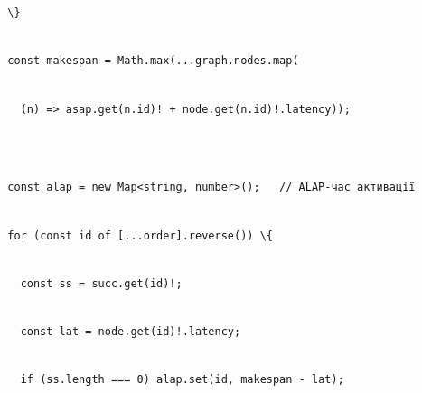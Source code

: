 \documentclass[
]{article}
\newcommand{\passthrough}[1]{#1}
\begin{document}
\passthrough{\lstinline!  !}\passthrough{\lstinline!\}!}\strut \\
\passthrough{\lstinline!  !}\passthrough{\lstinline!const!}\passthrough{\lstinline! !}\passthrough{\lstinline!makespan!}\passthrough{\lstinline! !}\passthrough{\lstinline!=!}\passthrough{\lstinline! !}\passthrough{\lstinline!Math.max!}\passthrough{\lstinline!(...!}\passthrough{\lstinline!graph.nodes.map!}\passthrough{\lstinline!(!}\strut \\
\passthrough{\lstinline!    !}\passthrough{\lstinline!(n)!}\passthrough{\lstinline! !}\passthrough{\lstinline!=>!}\passthrough{\lstinline! !}\passthrough{\lstinline!asap.get!}\passthrough{\lstinline"(n.id)!"}\passthrough{\lstinline! !}\passthrough{\lstinline!+!}\passthrough{\lstinline! !}\passthrough{\lstinline!node.get!}\passthrough{\lstinline"(n.id)!.latency));"}\strut \\
\strut \\
\passthrough{\lstinline!  !}\passthrough{\lstinline!const!}\passthrough{\lstinline! !}\passthrough{\lstinline!alap!}\passthrough{\lstinline! !}\passthrough{\lstinline!=!}\passthrough{\lstinline! !}\passthrough{\lstinline!new!}\passthrough{\lstinline! !}\passthrough{\lstinline!Map<string,!}\passthrough{\lstinline! !}\passthrough{\lstinline!number>();!}\passthrough{\lstinline!   !}\passthrough{\lstinline!//!}\passthrough{\lstinline! !}\passthrough{\lstinline!ALAP-час!}\passthrough{\lstinline! !}\passthrough{\lstinline!активації!}\strut \\
\passthrough{\lstinline!  !}\passthrough{\lstinline!for!}\passthrough{\lstinline! !}\passthrough{\lstinline!(const!}\passthrough{\lstinline! !}\passthrough{\lstinline!id!}\passthrough{\lstinline! !}\passthrough{\lstinline!of!}\passthrough{\lstinline! !}\passthrough{\lstinline![...order].reverse())!}\passthrough{\lstinline! !}\passthrough{\lstinline!\{!}\strut \\
\passthrough{\lstinline!    !}\passthrough{\lstinline!const!}\passthrough{\lstinline! !}\passthrough{\lstinline!ss!}\passthrough{\lstinline! !}\passthrough{\lstinline!=!}\passthrough{\lstinline! !}\passthrough{\lstinline!succ.get!}\passthrough{\lstinline"(id)!;"}\strut \\
\passthrough{\lstinline!    !}\passthrough{\lstinline!const!}\passthrough{\lstinline! !}\passthrough{\lstinline!lat!}\passthrough{\lstinline! !}\passthrough{\lstinline!=!}\passthrough{\lstinline! !}\passthrough{\lstinline!node.get!}\passthrough{\lstinline"(id)!.latency;"}\strut \\
\passthrough{\lstinline!    !}\passthrough{\lstinline!if!}\passthrough{\lstinline! !}\passthrough{\lstinline!(!}\passthrough{\lstinline!ss.length!}\passthrough{\lstinline! !}\passthrough{\lstinline!===!}\passthrough{\lstinline! !}\passthrough{\lstinline!0)!}\passthrough{\lstinline! !}\passthrough{\lstinline!alap.set!}\passthrough{\lstinline!(id,!}\passthrough{\lstinline! !}\passthrough{\lstinline!makespan!}\passthrough{\lstinline! !}\passthrough{\lstinline!-!}\passthrough{\lstinline! !}\passthrough{\lstinline!lat!}\passthrough{\lstinline!);!}\strut \\
\end{document}
